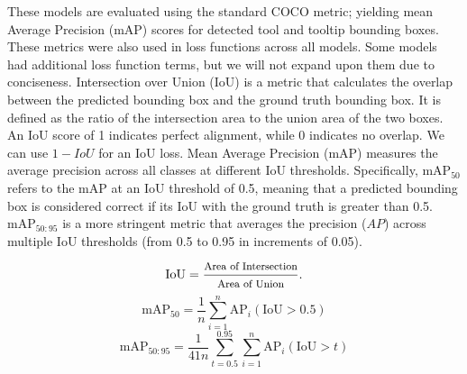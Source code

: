 These models are evaluated using the standard COCO metric; yielding mean Average Precision (mAP) scores for detected tool and tooltip bounding boxes. These metrics were also used in loss functions across all models. Some models had additional loss function terms, but we will not expand upon them due to conciseness. Intersection over Union (IoU) is a metric that calculates the overlap between the predicted bounding box and the ground truth bounding box. It is defined as the ratio of the intersection area to the union area of the two boxes. An IoU score of 1 indicates perfect alignment, while 0 indicates no overlap. We can use $1 - IoU$ for an IoU loss. Mean Average Precision (mAP) measures the average precision across all classes at different IoU thresholds. Specifically, mAP$_{50}$ refers to the mAP at an IoU threshold of 0.5, meaning that a predicted bounding box is considered correct if its IoU with the ground truth is greater than 0.5. mAP$_{50:95}$ is a more stringent metric that averages the precision ($AP$) across multiple IoU thresholds (from 0.5 to 0.95 in increments of 0.05). 

\begin{small}
\begin{equation}
    \text{IoU} = \frac{\text{\footnotesize{Area of Intersection}}}{\text{\footnotesize{Area of Union}}}.
\end{equation}
\begin{equation}
    \text{mAP}_{50} = \frac{1}{n} \sum_{i=1}^{n} \text{AP}_{i}(\text{IoU} > 0.5)
\end{equation}
\begin{equation}
    \text{mAP}_{50:95} = \frac{1}{41n} \sum_{t=0.5}^{0.95} \sum_{i=1}^{n} \text{AP}_{i}(\text{IoU} > t)
\end{equation}
\end{small}